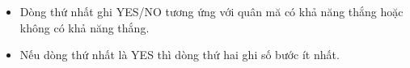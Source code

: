 \begin{itemize}
	\item     Dòng thứ nhất ghi YES/NO tương ứng với quân mă có khả năng thắng hoặc không có khả năng thắng.   
	\item     Nếu dòng thứ nhất là YES thì dòng thứ hai ghi số bước ít nhất.   
\end{itemize}